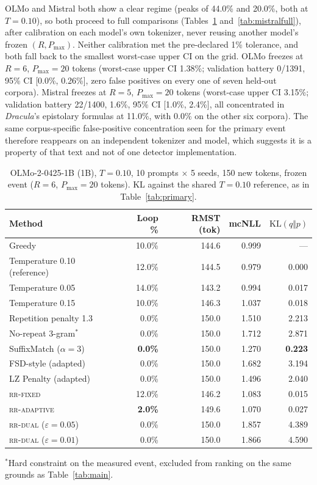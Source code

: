 \documentclass[make,article,submit,pdftex]{Definitions/mdpi}
\providecommand{\KL}{}\renewcommand{\KL}{\mathrm{KL}}
\begin{document}
OLMo and Mistral both show a clear regime (peaks of 44.0\% and 20.0\%, both at $T{=}0.10$), so both proceed to full comparisons (Tables~\ref{tab:olmofull} and~\ref{tab:mistralfull}), after calibration on each model's own tokenizer, never reusing another model's frozen $(R,P_{\max})$. Neither calibration met the pre-declared 1\% tolerance, and both fall back to the smallest worst-case upper CI on the grid. OLMo freezes at $R{=}6$, $P_{\max}{=}20$ tokens (worst-case upper CI 1.38\%; validation battery 0/1391, 95\% CI [0.0\%, 0.26\%], zero false positives on every one of seven held-out corpora). Mistral freezes at $R{=}5$, $P_{\max}{=}20$ tokens (worst-case upper CI 3.15\%; validation battery 22/1400, 1.6\%, 95\% CI [1.0\%, 2.4\%], all concentrated in \emph{Dracula}'s epistolary formulas at 11.0\%, with 0.0\% on the other six corpora). The same corpus-specific false-positive concentration seen for the primary event therefore reappears on an independent tokenizer and model, which suggests it is a property of that text and not of one detector implementation.

\begin{table}[H]
\centering
\caption{OLMo-2-0425-1B (1B), $T{=}0.10$, 10 prompts $\times$ 5 seeds, 150 new tokens, frozen event ($R{=}6$, $P_{\max}{=}20$ tokens). KL against the shared $T{=}0.10$ reference, as in Table~\ref{tab:primary}.}
\label{tab:olmofull}
\begin{tabular}{@{}lrrrr@{}}
\toprule
Method & Loop \% & RMST (tok) & mcNLL & $\KL(q\Vert p)$ \\
\midrule
Greedy                      & 10.0\% & 144.6 & 0.999 & --- \\
Temperature 0.10 (reference) & 12.0\% & 144.5 & 0.979 & 0.000 \\
Temperature 0.05             & 14.0\% & 143.2 & 0.994 & 0.017 \\
Temperature 0.15             & 10.0\% & 146.3 & 1.037 & 0.018 \\
Repetition penalty 1.3        & 0.0\%  & 150.0 & 1.510 & 2.213 \\
No-repeat 3-gram$^{*}$       & 0.0\%  & 150.0 & 1.712 & 2.871 \\
SuffixMatch ($\alpha{=}3$)    & \textbf{0.0\%}  & 150.0 & 1.270 & \textbf{0.223} \\
FSD-style (adapted)          & 0.0\%  & 150.0 & 1.682 & 3.194 \\
LZ Penalty (adapted)        & 0.0\%  & 150.0 & 1.496 & 2.040 \\
\textsc{rr-fixed}             & 12.0\% & 146.2 & 1.083 & 0.015 \\
\textsc{rr-adaptive}          & \textbf{2.0\%}  & 149.6 & 1.070 & 0.027 \\
\textsc{rr-dual} ($\varepsilon{=}0.05$) & 0.0\% & 150.0 & 1.857 & 4.389 \\
\textsc{rr-dual} ($\varepsilon{=}0.01$) & 0.0\% & 150.0 & 1.866 & 4.590 \\
\bottomrule
\end{tabular}

\vspace{4pt}
{\footnotesize $^{*}$Hard constraint on the measured event, excluded from ranking on the same grounds as Table~\ref{tab:main}.}
\end{table}
\end{document}
